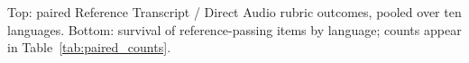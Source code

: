 Top: paired Reference Transcript / Direct Audio rubric outcomes, pooled over ten languages. Bottom: survival of reference-passing items by language; counts appear in Table~\ref{tab:paired_counts}.
